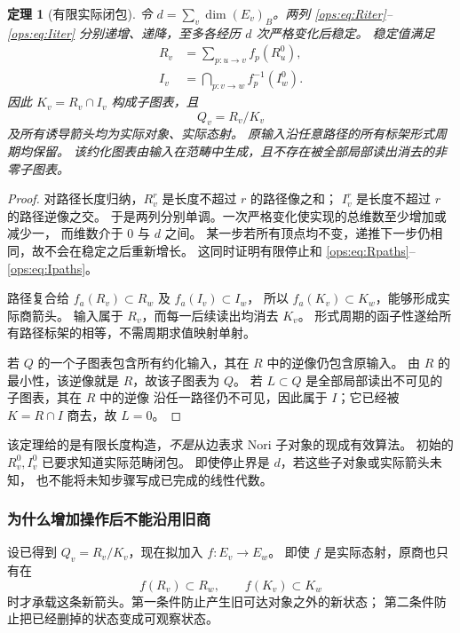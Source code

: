 \documentclass[11pt,a4paper,oneside]{ctexart}
\theoremstyle{cnplain}
\newtheorem{theorem}{定理}[section]
\theoremstyle{definition}
\theoremstyle{remark}
\numberwithin{equation}{section}
\begin{document}
\begin{theorem}[有限实际闭包]\label{ops:thm:network}
令 $d=\sum_v\dim(E_v)_B$。两列 \eqref{ops:eq:Riter}--\eqref{ops:eq:Iiter}
分别递增、递降，至多各经历 $d$ 次严格变化后稳定。
稳定值满足
\begin{align}
 R_v&=\sum_{p:u\to v}f_p(R_u^0),\label{ops:eq:Rpaths}\\
 I_v&=\bigcap_{p:v\to w}f_p^{-1}(I_w^0).\label{ops:eq:Ipaths}
\end{align}
因此 $K_v=R_v\cap I_v$ 构成子图表，且
\begin{equation}\label{ops:eq:networkQ}
 Q_v=R_v/K_v
\end{equation}
及所有诱导箭头均为实际对象、实际态射。
原输入沿任意路径的所有标架形式周期均保留。
该约化图表由输入在范畴中生成，且不存在被全部局部读出消去的非零子图表。
\end{theorem}
\begin{proof}
对路径长度归纳，$R_v^r$ 是长度不超过 $r$ 的路径像之和；
$I_v^r$ 是长度不超过 $r$ 的路径逆像之交。
于是两列分别单调。一次严格变化使实现的总维数至少增加或减少一，
而维数介于 $0$ 与 $d$ 之间。
某一步若所有顶点均不变，递推下一步仍相同，故不会在稳定之后重新增长。
这同时证明有限停止和 \eqref{ops:eq:Rpaths}--\eqref{ops:eq:Ipaths}。

路径复合给 $f_a(R_v)\subset R_w$ 及 $f_a(I_v)\subset I_w$，
所以 $f_a(K_v)\subset K_w$，能够形成实际商箭头。
输入属于 $R_v$，而每一后续读出均消去 $K_v$。
形式周期的函子性遂给所有路径标架的相等，不需周期求值映射单射。

若 $Q$ 的一个子图表包含所有约化输入，其在 $R$ 中的逆像仍包含原输入。
由 $R$ 的最小性，该逆像就是 $R$，故该子图表为 $Q$。
若 $L\subset Q$ 是全部局部读出不可见的子图表，其在 $R$ 中的逆像
沿任一路径仍不可见，因此属于 $I$；它已经被 $K=R\cap I$ 商去，故 $L=0$。
\end{proof}

该定理给的是有限长度构造，\emph{不是}从边表求 Nori 子对象的现成有效算法。
初始的 $R_v^0,I_v^0$ 已要求知道实际范畴闭包。
即使停止界是 $d$，若这些子对象或实际箭头未知，
也不能将未知步骤写成已完成的线性代数。

\subsubsection{为什么增加操作后不能沿用旧商}
设已得到 $Q_v=R_v/K_v$，现在拟加入 $f:E_v\to E_w$。
即使 $f$ 是实际态射，原商也只有在
\begin{equation}\label{ops:eq:descent}
 f(R_v)\subset R_w,\qquad f(K_v)\subset K_w
\end{equation}
时才承载这条新箭头。第一条件防止产生旧可达对象之外的新状态；
第二条件防止把已经删掉的状态变成可观察状态。
\end{document}
